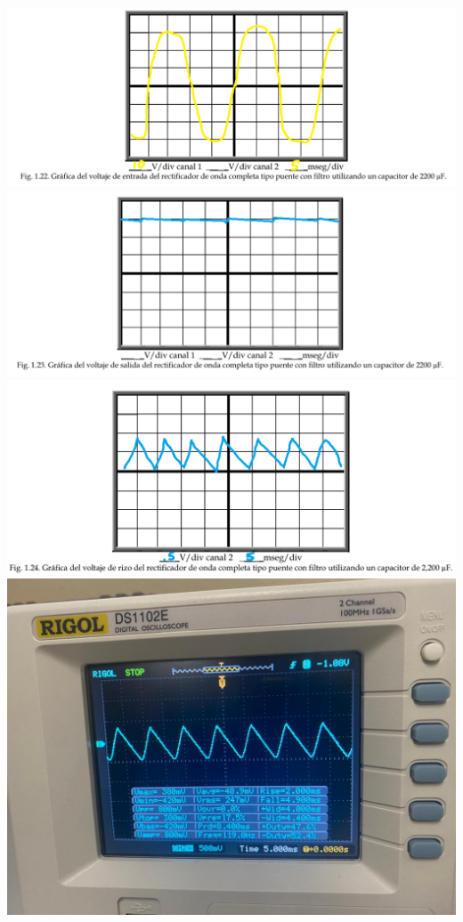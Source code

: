 \documentclass[12pt]{article}
\begin{document}
\begin{enumerate}
\begin{enumerate}
            \begin{center}
                \includegraphics*[scale=0.45]{fig1-22.png}
                \includegraphics*[scale=0.45]{fig1-23.png}
                \includegraphics*[scale=0.45]{fig1-24.png}
                \includegraphics*[scale=0.2]{img1-24.jpg}
            \end{center}


        

        
        \end{enumerate}


        \end{enumerate}
\end{document}
